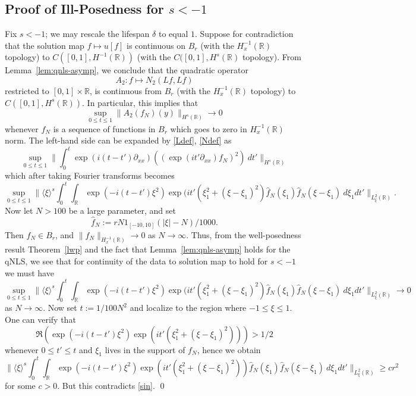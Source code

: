 \documentclass[12pt,reqno]{amsart}
\numberwithin{equation}{section}  %
\newcommand{\rr}{\mathbb{R}}
\newcommand{\R}{\mathbb{R}}
\begin{document}
\subsection{Proof of Ill-Posedness for $s < -1$} 
%
%
%
Fix $s < -1$; we may rescale the lifespan $\delta$ to equal $1$.  Suppose for contradiction
that the solution map $f \mapsto u[f]$ is continuous on $B_r$ (with the
$H^{-1}_x(\R)$ topology) to $C([0, 1], H^{-1}(\rr))$ 
(with the $C([0,1], H^{s}(\rr)$ topology). From 
Lemma~\ref{lem:qnls-asymp}, we conclude that the quadratic operator
$$ A_2: f \mapsto N_2(Lf, Lf)$$ 
restricted to $[0,1] \times \R$, is continuous from $B_r$ (with the $H^{-1}_x(\R)$ topology) 
to $C([0,1], H^{s}(\rr))$.  In particular, this implies that
$$ \sup_{0 \leq t\leq 1}\| A_2(f_N)(y) \|_{H^{s}(\R)} \to 0$$
whenever $f_N$ is a sequence of functions in $B_r$ which goes to zero in $H^{-1}_x(\R)$ norm.
The left-hand side can be expanded by \eqref{Ldef}, \eqref{Ndef} as
$$ \sup_{0 \leq t \leq 1} 
\| \int_0^t \exp(i(t-t')\partial_{xx})((\exp(it' \partial_{xx}) f_N)^2)\ dt' \|_{H^{s}(\R)}$$
which after taking Fourier transforms becomes
$$\sup_{0 \leq t \leq 1} 
\| \langle \xi \rangle^{s}
\int_0^t \int_\R \exp(-i(t-t')\xi^2) \exp(it' (\xi_1^2 + (\xi-\xi_1)^2) \hat f_N(\xi_1) \hat f_N(\xi-\xi_1)\ d\xi_1 dt'
\|_{L^2_\xi(\R)}.$$
Now let $N > 100$ be a large parameter, and set 
$$ \hat f_N := r N 1_{[-10,10]}(|\xi|-N) / 1000.$$
Then $f_N \in B_r$, and $\|f_N\|_{H^{-1}_x(\R)} \to 0$ as $N \to \infty$.  Thus,
from the well-posedness result Theorem~\ref{lwp} and the fact that
Lemma~\ref{lem:qnls-asymp}
holds for
the qNLS, we see that for continuity of the data to solution map to hold for $s < -1$ we must have
\begin{equation}\label{sin}
\sup_{0 \leq t \leq 1} \| \langle \xi \rangle^{s}
\int_0^t \int_\R \exp(-i(t-t')\xi^2) \exp(it' (\xi_1^2 + (\xi-\xi_1)^2) \hat f_N(\xi_1) \hat f_N(\xi-\xi_1)\ d\xi_1 dt'
\|_{L^2_\xi(\R)} \to 0
\end{equation}
as $N \to \infty$.
Now set $t := 1/100N^2$ and localize to the region where $-1 \leq \xi \leq 1$.  One can verify that
$$ \Re( \exp(-i(t-t')\xi^2) \exp(it' (\xi_1^2 + (\xi-\xi_1)^2) )) > 1/2$$
whenever $0 \leq t' \leq t$ and $\xi_1$ lives in the support of $f_{N}$, hence we obtain
$$ 
\| \langle \xi \rangle^{s}
\int_0^t \int_\R \exp(-i(t-t')\xi^2) \exp(it' (\xi_1^2 + (\xi-\xi_1)^2)) \hat f_N(\xi_1) \hat f_N(\xi-\xi_1)\ d\xi_1 dt'
\|_{L^2_\xi(\R)} \geq c r^2$$
for some $c > 0$.  But this contradicts \eqref{sin}. \qed
%
%


\end{document}
